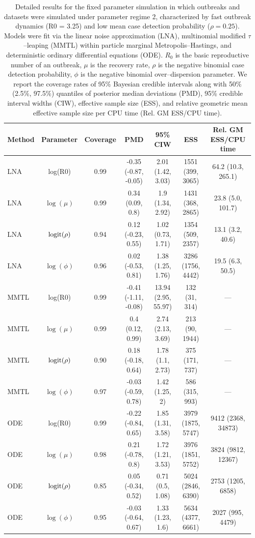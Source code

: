 \begin{table}
	\begin{fullpage}
		\footnotesize
		\centering
		\begin{tabular}{lcccccc}
			\hline
			\textbf{Method} & \textbf{Parameter} & \textbf{Coverage} & \textbf{PMD} & \textbf{95\% CIW} & \textbf{ESS} & \textbf{Rel. GM ESS/CPU time} \\ 
			\hline
			LNA & log(R0) & 0.99 & -0.35 (-0.87, -0.05) & 2.01 (1.42, 3.03) & 1551 (399, 3065) & 64.2 (10.3, 265.1) \\ 
			LNA & $\log(\mu)$ & 0.99 & 0.34 (0.09, 0.8) & 1.9 (1.34, 2.92) & 1431 (368, 2865) & 23.8 (5.0, 101.7) \\ 
			LNA & $\mathrm{logit}(\rho)$ & 0.94 & 0.12 (-0.23, 0.55) & 1.02 (0.73, 1.71) & 1354 (509, 2357) & 13.1 (3.2, 40.6) \\ 
			LNA & $\log(\phi)$ & 0.96 & 0.02 (-0.53, 0.81) & 1.38 (1.25, 1.76) & 3286 (1756, 4442) & 19.5 (6.3, 50.5) \\ 
			MMTL & log(R0) & 0.99 & -0.41 (-1.11, -0.08) & 13.94 (2.95, 55.97) & 132 (31, 314) & --- \\ 
			MMTL & $\log(\mu)$ & 0.99 & 0.4 (0.12, 0.99) & 2.74 (2.13, 3.69) & 213 (90, 1944) & --- \\ 
			MMTL & $\mathrm{logit}(\rho)$ & 0.90 & 0.18 (-0.18, 0.64) & 1.78 (1.1, 2.73) & 375 (171, 737) & --- \\ 
			MMTL & $\log(\phi)$ & 0.97 & -0.03 (-0.59, 0.78) & 1.42 (1.25, 2) & 586 (315, 993) & --- \\ 
			ODE & log(R0) & 0.99 & -0.22 (-0.84, 0.65) & 1.85 (1.31, 3.58) & 3979 (1875, 5747) & 9412 (2368, 34873) \\ 
			ODE & $\log(\mu)$ & 0.98 & 0.21 (-0.78, 0.8) & 1.72 (1.21, 3.53) & 3976 (1851, 5752) & 3824 (9812, 12367) \\ 
			ODE & $\mathrm{logit}(\rho)$ & 0.85 & 0.05 (-0.34, 0.52) & 0.71 (0.5, 1.08) & 5024 (2846, 6390) & 2753 (1205, 6858) \\ 
			ODE & $\log(\phi)$ & 0.95 & -0.03 (-0.64, 0.67) & 1.33 (1.23, 1.6) & 5634 (4377, 6661) & 2027 (995, 4479) \\ 
			\hline
		\end{tabular}
		\caption[Fast dynamics, low detection probability regime fixed parameter coverage simulation results.]{Detailed results for the fixed parameter  simulation in which outbreaks and datasets were simulated under parameter regime 2, characterized by fast outbreak dynamics (R0 = 3.25) and low mean case detection probability ($ \rho = 0.25 $). Models were fit via the linear noise approximation (LNA), multinomial modified $ \tau $--leaping (MMTL) within particle marginal Metropolis--Hastings, and deterministic ordinary differential equations (ODE). $ R_0 $ is the basic reproductive number of an outbreak, $ \mu $ is the recovery rate, $ \rho $ is the negative binomial case detection probability, $ \phi $ is the negative binomial over--dispersion parameter. We report the coverage rates of 95\% Bayesian credible intervals along with 50\% (2.5\%, 97.5\%) quantiles of posterior median deviations (PMD), 95\% credible interval widths (CIW), effective sample size (ESS), and relative geometric mean effective sample size per CPU time (Rel. GM ESS/CPU time).}

\end{fullpage}
\end{table}

